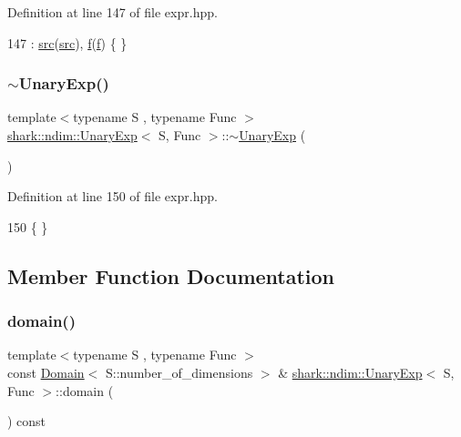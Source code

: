 Definition at line 147 of file expr.\+hpp.


\begin{DoxyCode}
147 : \hyperlink{classshark_1_1ndim_1_1_unary_exp_ad43011a53ffbee999334c7cc52fb95ad}{src}(\hyperlink{classshark_1_1ndim_1_1_unary_exp_ad43011a53ffbee999334c7cc52fb95ad}{src}), \hyperlink{classshark_1_1ndim_1_1_unary_exp_a7d3fe16a63fc7e035839407f24b586b9}{f}(\hyperlink{classshark_1_1ndim_1_1_unary_exp_a7d3fe16a63fc7e035839407f24b586b9}{f}) \{ \}
\end{DoxyCode}
\hypertarget{classshark_1_1ndim_1_1_unary_exp_a602b169be3f0bda9f2d668daf01e5ca2}{}\label{classshark_1_1ndim_1_1_unary_exp_a602b169be3f0bda9f2d668daf01e5ca2} 
\subsubsection{\texorpdfstring{$\sim$\+Unary\+Exp()}{~UnaryExp()}}
{\footnotesize\ttfamily template$<$typename S , typename Func $>$ \\
\hyperlink{classshark_1_1ndim_1_1_unary_exp}{shark\+::ndim\+::\+Unary\+Exp}$<$ S, Func $>$\+::$\sim$\hyperlink{classshark_1_1ndim_1_1_unary_exp}{Unary\+Exp} (\begin{DoxyParamCaption}{ }\end{DoxyParamCaption})}



Definition at line 150 of file expr.\+hpp.


\begin{DoxyCode}
150 \{ \}
\end{DoxyCode}


\subsection{Member Function Documentation}
\hypertarget{classshark_1_1ndim_1_1_unary_exp_a87bc70f88d3c8d535984595b20e4def3}{}\label{classshark_1_1ndim_1_1_unary_exp_a87bc70f88d3c8d535984595b20e4def3} 
\subsubsection{\texorpdfstring{domain()}{domain()}}
{\footnotesize\ttfamily template$<$typename S , typename Func $>$ \\
const \hyperlink{classshark_1_1ndim_1_1_domain}{Domain}$<$ S\+::number\+\_\+of\+\_\+dimensions $>$ \& \hyperlink{classshark_1_1ndim_1_1_unary_exp}{shark\+::ndim\+::\+Unary\+Exp}$<$ S, Func $>$\+::domain (\begin{DoxyParamCaption}{ }\end{DoxyParamCaption}) const\hspace{0.3cm}{\ttfamily [inline]}}



